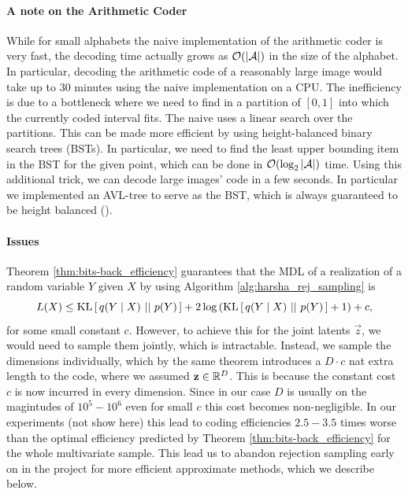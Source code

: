 \paragraph{A note on the Arithmetic Coder}
\par
While for small alphabets the naive implementation of the arithmetic coder is
very fast, the decoding time actually grows as $\mathcal{O}(|\mathcal{A}|)$ in the size of the
alphabet. In particular, decoding the arithmetic code of a reasonably large
image would take up to 30 minutes using the naive implementation on a CPU. The
inefficiency is due to a bottleneck where we need to find in a partition of $[0,
1]$ into which the currently coded interval fits. The naive
uses a linear search over the partitions. This can be made more efficient by
using height-balanced binary search trees (BSTs). In particular, we need to find
the least upper bounding item in the BST for the given point, which can be done
in $\mathcal{O}(\log_2|\mathcal{A}|)$ time.
Using this additional trick, we can decode large images' code in a few seconds.
In particular we implemented an AVL-tree to serve as the BST, which is always
guaranteed to be height balanced (\cite{adel1962algorithm}).

\paragraph{Issues} Theorem \ref{thm:bits-back_efficiency} guarantees that the
MDL of a realization of a random variable $Y$ given $X$ by using Algorithm
\ref{alg:harsha_rej_sampling} is
\[
  L(X) \leq \mathrm{KL}\left[\,q(Y \mid X)\,\,||\,\,p(Y)\,\right] + 2\log\left( \mathrm{KL}\left[\,q(Y \mid X)\,\,||\,\,p(Y)\,\right] + 1
  \right) + c,
\]
for some small constant $c$.
However, to achieve this for the joint latents $\vec{z}$, we would need to
sample them jointly, which is intractable. Instead, we sample the
dimensions individually, which by the same theorem introduces a $D\cdot c$ nat
extra length to the code, where we assumed $\mathbf{z} \in \mathbb{R}^D$. This is
because the constant cost $c$ is now incurred in every dimension. Since in our
case $D$ is usually on the magintudes of $10^5 - 10^6$ even for small $c$ this
cost becomes non-negligible. In our experiments (not show here) this lead to coding
efficiencies $2.5 - 3.5$ times worse than the optimal efficiency predicted by Theorem
\ref{thm:bits-back_efficiency} for the whole multivariate sample. This lead us
to abandon rejection sampling early on in the project for more efficient approximate methods,
which we describe below.

